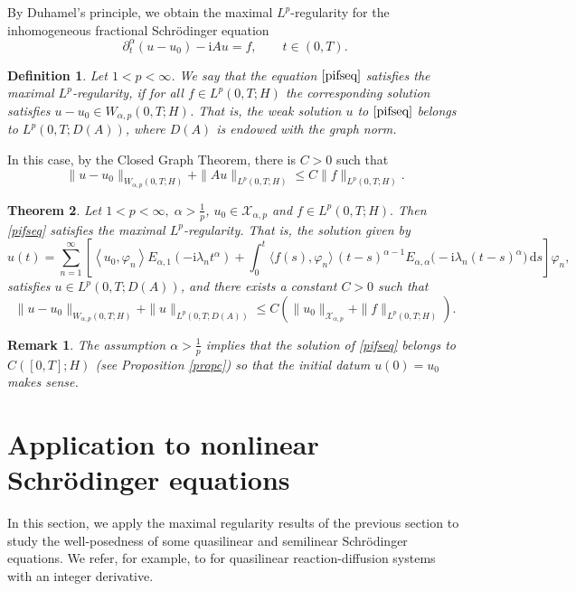 \documentclass[reqno]{amsart}
\newtheorem{theorem}{Theorem}[section]
\newtheorem{defn}[theorem]{Definition}
\newtheorem{rmk}{Remark}
\numberwithin{equation}{section}
\def \d {\mathrm{d}}
\begin{document}
By Duhamel's principle, we obtain the maximal $L^p$-regularity for the inhomogeneous fractional Schrödinger equation
\begin{equation}\label{pifseq}
\partial_t^\alpha (u-u_0) -\mathrm{i} Au=f, \qquad t \in (0,T).
\end{equation}
\begin{defn}
Let $1<p<\infty$. We say that the equation $\eqref{pifseq}$ satisfies the maximal $L^p$-regularity, if for all $f\in L^p(0,T;H)$ the corresponding solution satisfies $u-u_0\in W_{\alpha,p}(0,T;H)$. That is, the weak solution $u$ to $\eqref{pifseq}$ belongs to $L^p(0,T;D(A))$, where $D(A)$ is endowed with the graph norm.
\end{defn}
In this case, by the Closed Graph Theorem, there is $C>0$ such that
\begin{equation}
\|u-u_0\|_{W_{\alpha,p}(0,T;H)}+\|Au\|_{L^p(0,T;H)} \le C \|f\|_{L^p(0,T;H)}.
\end{equation}
\begin{theorem}\label{pithmMR}
Let $1<p<\infty, \; \alpha >\frac{1}{p}$, $u_0\in \mathcal{X}_{\alpha,p}$ and $f\in L^p(0,T;H).$ Then \eqref{pifseq} satisfies the maximal $L^p$-regularity. That is, the solution given by
\begin{equation*}
u(t)=\sum_{n=1}^{\infty}\left[\left\langle u_0, \varphi_n\right\rangle E_{\alpha, 1}\left(-\mathrm{i} \lambda_n t^\alpha\right) + \int_0^t \langle f(s),\varphi_n\rangle\,(t-s)^{\alpha-1}E_{\alpha,\alpha}\big(-\mathrm{i}\lambda_n (t-s)^\alpha\big)\,\d s \right]\varphi_n,
\end{equation*}
satisfies $u\in L^p(0,T;D(A))$, and there exists a constant $C>0$ such that
\[
\|u-u_0\|_{W_{\alpha,p}(0,T;H)} + \|u\|_{L^p(0,T;D(A))}\le C\left(\|u_0\|_{\mathcal{X}_{\alpha,p}}+\|f\|_{L^p(0,T;H)}\right).
\]
\end{theorem}
\begin{rmk}
The assumption $\alpha>\frac{1}{p}$ implies that the solution of \eqref{pifseq} belongs to $C([0,T];H)$ (see Proposition \ref{propc}) so that the initial datum $u(0)=u_0$ makes sense.
\end{rmk}


\section{Application to nonlinear Schr\"odinger equations}\label{sec6}
In this section, we apply the maximal regularity results of the previous section to study the well-posedness of some quasilinear and semilinear Schr\"odinger equations. We refer, for example, to \cite{Mey14} for quasilinear reaction-diffusion systems with an integer derivative.
\end{document}
